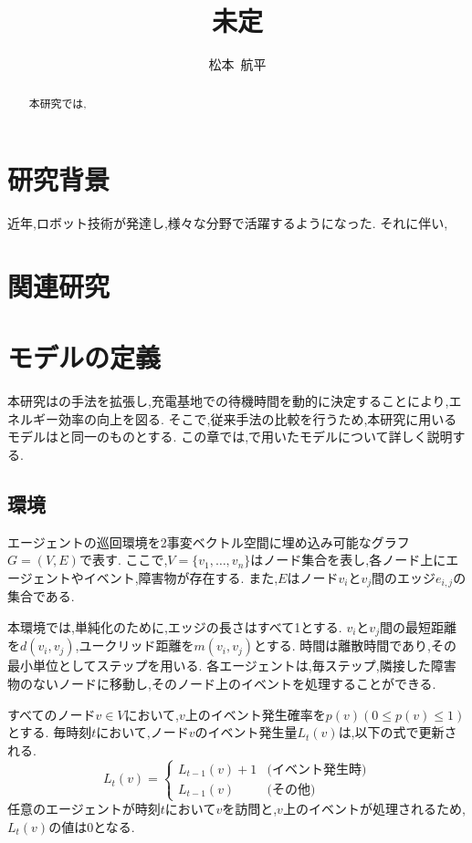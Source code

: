 \documentclass[12pt,a4j,twoside]{jarticle}
\title{未定}{5}
\author{松本~航平}
\begin{document}
\maketitle

\begin{abstract}
  本研究では,
\end{abstract}

\vspace*{1cm}\par
\section{研究背景}
近年,ロボット技術が発達し,様々な分野で活躍するようになった.
それに伴い,

\section{関連研究}

\section{モデルの定義}
本研究は\cite{Wu2019}の手法を拡張し,充電基地での待機時間を動的に決定することにより,エネルギー効率の向上を図る.
そこで,従来手法の比較を行うため,本研究に用いるモデルは\cite{Wu2019}と同一のものとする.
この章では,\cite{Wu2019}で用いたモデルについて詳しく説明する.

\subsection{環境}
エージェントの巡回環境を2事変ベクトル空間に埋め込み可能なグラフ$G = (V, E)$で表す.
ここで,$V = \{ v_1, \dots ,v_n \}$はノード集合を表し,各ノード上にエージェントやイベント,障害物が存在する.
また,$E$はノード$v_i$と$v_j$間のエッジ$e_{i, j}$の集合である.

\par
本環境では,単純化のために,エッジの長さはすべて1とする.
$v_i$と$v_j$間の最短距離を$d(v_i, v_j)$,ユークリッド距離を$m(v_i, v_j)$とする.
時間は離散時間であり,その最小単位としてステップを用いる.
各エージェントは,毎ステップ,隣接した障害物のないノードに移動し,そのノード上のイベントを処理することができる.

\par
すべてのノード$v \in V$において,$v$上のイベント発生確率を$p(v) (0 \leq p(v) \leq 1)$とする.
毎時刻$t$において,ノード$v$のイベント発生量$L_t(v)$は,以下の式で更新される.
\begin{equation}
  L_t(v) = 
  \begin{cases}
    L_{t-1}(v) + 1 & \textrm{(イベント発生時)} \\
    L_{t-1}(v)     & \textrm{(その他)}
  \end{cases}
\end{equation}
任意のエージェントが時刻$t$において$v$を訪問と,$v$上のイベントが処理されるため,$L_t(v)$の値は0となる.
\end{document}
